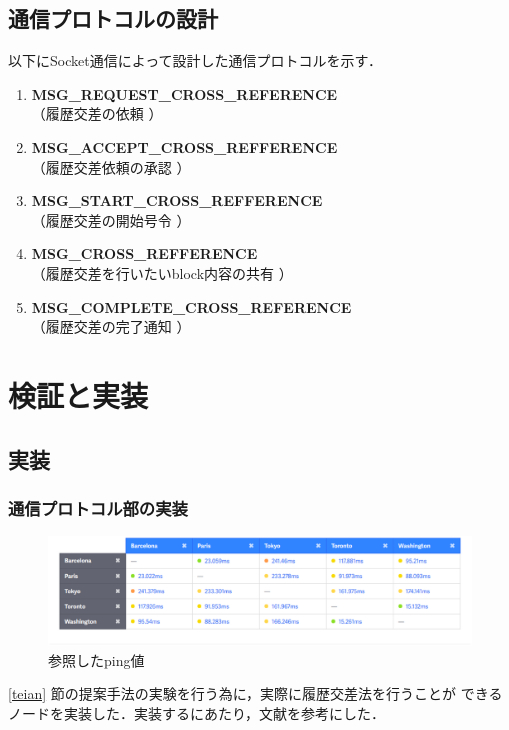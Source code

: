 \documentclass[a4paper,12pt]{jsarticle}
\begin{document}
\subsection{通信プロトコルの設計}

以下にSocket通信によって設計した通信プロトコルを示す．

\hspace{5mm}
%
\begin{enumerate}
\item \textbf{MSG\_REQUEST\_CROSS\_REFERENCE}\\
\hspace{12mm} （履歴交差の依頼 ）
\item \textbf{MSG\_ACCEPT\_CROSS\_REFFERENCE}\\
\hspace{12mm}  （履歴交差依頼の承認 ）
  \item \textbf{MSG\_START\_CROSS\_REFFERENCE}\\
\hspace{12mm}  （履歴交差の開始号令 ）
  \item \textbf{MSG\_CROSS\_REFFERENCE}\\
\hspace{12mm}  （履歴交差を行いたいblock内容の共有 ）
  \item \textbf{MSG\_COMPLETE\_CROSS\_REFERENCE}\\
\hspace{12mm}  （履歴交差の完了通知 ）
\end{enumerate}
%
\hspace{5mm}
\newpage

\section{検証と実装}
\subsection{実装}
\subsubsection{通信プロトコル部の実装}
\label{syuhou}

%
\begin{figure}[H]%
  \begin{center}
    \includegraphics[width=160mm]{pht/Screenshot.eps}
  \end{center}
	\caption{参照したping値\cite{pings}}
  \label{fig:pings}
\end{figure}
%
\ref{teian} 節の提案手法の実験を行う為に，実際に履歴交差法を行うことが
できるノードを実装した．実装するにあたり，文献\cite{hamatsu2018}を参考にした．
\end{document}
